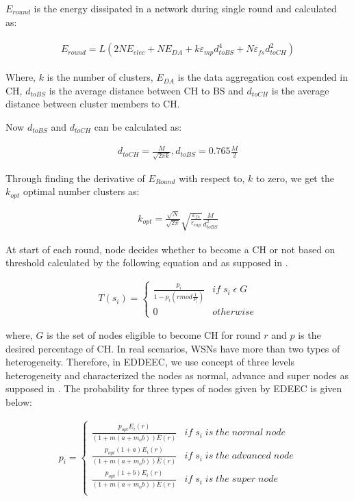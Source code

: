 \documentclass[3p,times,procedia]{elsarticle}
\begin{document}
$E_{round}$ is the energy dissipated in a network during single round and calculated as:

\begin{eqnarray}
\begin{split}
E_{round}= L(2NE_{elec}+NE_{DA}+k\varepsilon_{mp}d_{to BS}^{4}+N\varepsilon_{fs}d_{to CH}^{2})
\end{split}
\end{eqnarray}

Where, $k$ is the number of clusters, $E_{DA}$ is the data aggregation cost expended in CH, $d_{toBS}$ is the average distance between CH to BS and $d_{toCH}$ is the average distance between cluster members to CH.

Now $d_{to BS}$ and $d_{to CH}$ can be calculated as:

\begin{eqnarray}
d_{to CH}= \frac{M}{\sqrt{2 \pi k}}, d_{to BS}= 0.765\frac{M}{2}
\end{eqnarray}

Through finding the derivative of $E_{Round}$ with respect to, $k$ to zero, we get the $k_{opt}$ optimal number clusters as:

\begin{eqnarray}
k_{opt}=\frac{\sqrt{N}}{\sqrt{2\pi}}\sqrt{\frac{\varepsilon_{fs}}{\varepsilon_{mp}}}\frac{M}{d_{toBS}^{2}}
\end{eqnarray}

At start of each round, node decides whether to become a CH or not based on threshold calculated by the following equation and as supposed in \cite{Reference 5, Reference 10}.

\begin{eqnarray}
T(s_{i})=
\begin{cases}
\frac{p_{i}}{1-p_{i}(rmod\frac{1}{P_{i}})} & if\; s_{i}\;\epsilon \;G \\
0 & otherwise
\end{cases}
\end{eqnarray}

where, $G$ is the set of nodes eligible to become CH for round $r$ and $p$ is the desired percentage of CH.
In real scenarios, WSNs have more than two types of heterogeneity. Therefore, in EDDEEC, we use concept of three levels heterogeneity and characterized the nodes as normal, advance and super nodes as supposed in \cite{Reference 12}. The probability for three types of nodes given by EDEEC is given below:

\begin{eqnarray}
p_{i}=
\begin{cases}
\frac{p_{opt}E_{i}(r)}{(1+m(a+m_{o}b))\bar{E}(r)}   & if \; s_{i} \;is\; the\; normal \;node\\
\frac{p_{opt}(1+a)E_{i}(r)}{(1+m(a+m_{o}b))\bar{E}(r)}  & if \;s_{i}\; is \;the \;advanced \;node\\
\frac{p_{opt}(1+b)E_{i}(r)}{(1+m(a+m_{o}b))\bar{E}(r)}  & if \;s_{i} \; is \;the\; super \;node\\
\end{cases}
\end{eqnarray}
\end{document}
